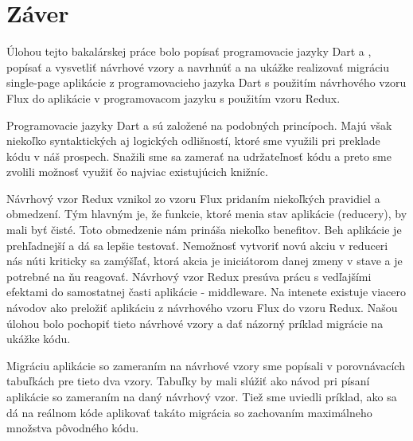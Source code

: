 \chapter*{Záver}  %

Úlohou tejto bakalárskej práce bolo popísať programovacie jazyky Dart a \JS{}, popísať a vysvetliť návrhové vzory a navrhnúť a na ukážke realizovať migráciu single-page aplikácie z programovacieho jazyka Dart s použitím návrhového vzoru Flux do aplikácie v programovacom jazyku \JS{} s použitím vzoru Redux.

Programovacie jazyky Dart a \JS{} sú založené na podobných princípoch. Majú však niekoľko syntaktických aj logických odlišností, ktoré sme využili pri preklade kódu v náš prospech. Snažili sme sa zamerať na udržateľnosť kódu a preto sme zvolili možnosť využiť čo najviac existujúcich knižníc.

Návrhový vzor Redux vznikol zo vzoru Flux pridaním niekoľkých pravidiel a obmedzení. Tým hlavným je, že funkcie, ktoré menia stav aplikácie (reducery), by mali byť čisté. Toto obmedzenie nám prináša niekoľko benefitov.
Beh aplikácie je prehľadnejší a dá sa lepšie testovať.
Nemožnosť vytvoriť novú akciu v reduceri nás núti kriticky sa zamýšľať, ktorá akcia je iniciátorom danej zmeny v stave a je potrebné na ňu reagovať. 
Návrhový vzor Redux presúva prácu s vedľajšími efektami do samostatnej časti aplikácie - middleware. 
Na intenete existuje viacero návodov ako preložiť aplikáciu z návrhového vzoru Flux do vzoru Redux. Našou úlohou bolo pochopiť tieto návrhové vzory a dať názorný príklad migrácie na ukážke kódu.

Migráciu aplikácie so zameraním na návrhové vzory sme popísali v porovnávacích tabuľkách pre tieto dva vzory. Tabuľky by mali slúžiť ako návod pri písaní aplikácie so zameraním na daný návrhový vzor. Tiež sme uviedli príklad, ako sa dá na reálnom kóde aplikovať takáto migrácia so zachovaním maximálneho množstva pôvodného kódu.


